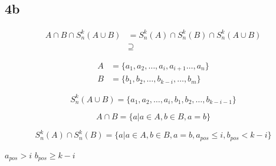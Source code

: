 \subsection*{4b}

\begin{align*}
    A \cap B \cap S^{k}_{n}(A \cup B) &= S^{k}_{n}(A) \cap S^{k}_{n}(B) \cap S^{k}_{n}(A \cup B)\\
    &\supseteq
\end{align*}

\begin{align*}
    A &=\{a_1, a_2, \dots , a_{i}, a_{i+1} \dots  , a_n\}\\
    B &=\{b_1, b_2, \dots , b_{k-i}, \dots , b_m\}
\end{align*}

\begin{equation*}
    S^{k}_{n}(A\cup B) =\{a_1, a_2, \dots , a_{i}, b_1, b_2, \dots , b_{k-i-1}\}
\end{equation*}

\begin{equation*}
    A \cap B = \{ a | a \in A, b \in B, a = b\}
\end{equation*}

\begin{equation*}
    S^{k}_{n}(A) \cap S^{k}_{n}(B) = \{a | a \in A, b \in B, a = b, a_{pos} \le i, b_{pos} < k-i\}
\end{equation*}

$a_{pos} > i$ $b_{pos} \ge k-i$
